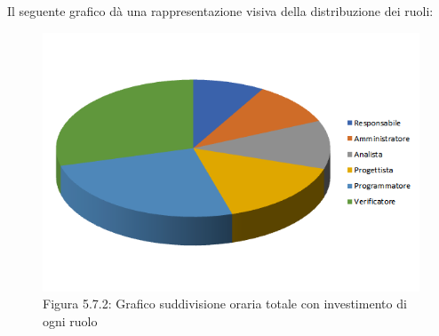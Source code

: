 Il seguente grafico dà una rappresentazione visiva della distribuzione dei ruoli: \\
\begin{figure} [H]
	\centering
	\includegraphics[scale=1]{Res/ExcelGrafici/Grafici/InvestimentoRuoli.png}
	\caption{Figura 5.7.2: Grafico suddivisione oraria totale con investimento di ogni ruolo}\label{}
\end{figure}


\pagebreak
